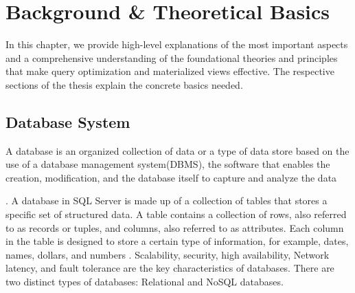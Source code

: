 \section{Background \& Theoretical Basics }

In this chapter, we provide high-level explanations of the most important aspects and a comprehensive understanding of the foundational theories and principles that make query optimization and materialized views effective. The respective sections of the thesis explain the concrete basics needed.

\subsection{ Database System}

\begin{definition}
A database is an organized collection of data or a type of data store based on the use of a database management system(DBMS), the software that enables the creation, modification, and the database itself to capture and analyze the data \end{definition}.\vspace{.4cm}
A database in SQL Server is made up of a collection of tables that stores a specific set of structured data. A table contains a collection of rows, also referred to as records or tuples, and columns, also referred to as attributes. Each column in the table is designed to store a certain type of information, for example, dates, names, dollars, and numbers \cite{williamdassafmsft-2024}. Scalability, security, high availability, Network latency, and fault tolerance are the key characteristics of databases. There are two distinct types of databases: Relational and NoSQL databases.

